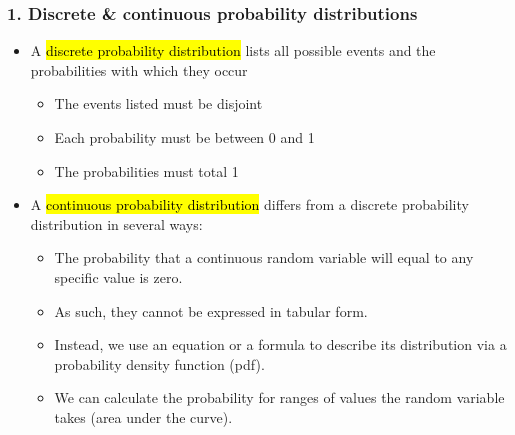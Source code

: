 \documentclass[11pt,containsverbatim,handout,xcolor=xelatex,dvipsnames,table]{beamer}
\begin{document}

\begin{frame}
\frametitle{1. Discrete \& continuous probability distributions}

\begin{itemize}

\item A \hl{discrete probability distribution} lists all possible events and the probabilities with which they occur
\begin{itemize}
\item The events listed must be disjoint
\item Each probability must be between 0 and 1 
\item The probabilities must total 1
\end{itemize}

\pause

\item A \hl{continuous probability distribution} differs from a discrete probability distribution in several ways:
\begin{itemize}
\item The probability that a continuous random variable will equal to any specific value is zero.
\item As such, they cannot be expressed in tabular form.
\item Instead, we use an equation or a formula to describe its distribution via a probability density function (pdf).
\item We can calculate the probability for ranges of values the random variable takes (area under the curve).
\end{itemize}

\end{itemize}

\end{frame}

\end{document}
